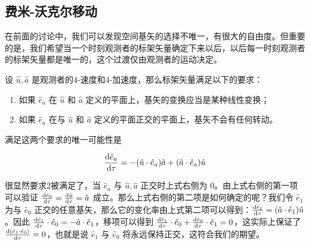 \subsection{费米-沃克尔移动}
在前面的讨论中，我们可以发现空间基矢的选择不唯一，有很大的自由度。但重要的是，我们希望当一个时刻观测者的标架矢量确定下来以后，以后每一时刻观测者的标架矢量都是唯一的，这个过渡仅由观测者的运动决定。

设 $\hat{u},\hat{a}$ 是观测者的4-速度和4-加速度，那么标架矢量满足以下的要求：
\begin{enumerate}
\item 如果 $\hat{e}_a$ 在 $\hat u$ 和 $\hat a$ 定义的平面上，基矢的变换应当是某种线性变换；
\item 如果 $\hat{e}_a$ 在与 $\hat u$ 和 $\hat a$ 定义的平面正交的平面上，基矢不会有任何转动。
\end{enumerate}

满足这两个要求的唯一可能性是

\begin{equation}
\begin{aligned}
\frac{{\rm d} \hat{e}_a}{{\rm d} \tau}=-(\hat u\cdot\hat{e}_a)\hat a+ (\hat a\cdot \hat{e}_a)\hat u
\end{aligned}
\end{equation}

很显然要求2被满足了，当 $\hat{e}_a$ 与 $\hat u,\hat a$ 正交时上式右侧为 0。由上式右侧的第一项可以验证 $\frac{{\rm d}\hat{e}_0}{{\rm d}\tau}=\frac{{\rm d}\hat u}{{\rm d}\tau}=\hat a$ 成立。那么上式右侧的第二项是如何确定的呢？我们令 $\hat{e}_1$ 为与 $\hat{e}_0$ 正交的任意基矢，那么它的变化率由上式第二项可以得到：$\frac{{\rm d}\hat{e}_1}{{\rm d}\tau}=(\hat a\cdot \hat{e}_1)\hat u$。因此 $\frac{{\rm d}\hat{e}_1}{{\rm d}\tau}\cdot \hat{e}_0=-\hat a\cdot \hat{e}_1$，移项可以得到 $\frac{{\rm d}\hat{e}_1}{{\rm d}\tau}\cdot \hat{e}_0+ \frac{{\rm d}\hat{e}_0}{{\rm d}\tau} \cdot \hat{e}_1=0$，这实际上保证了 $\frac{{\rm d} (\hat{e}_1\cdot \hat{e}_0)}{{\rm d}\tau}=0$，也就是说 $\hat{e}_1$ 与 $\hat{e}_0$ 将永远保持正交，这符合我们的期望。
